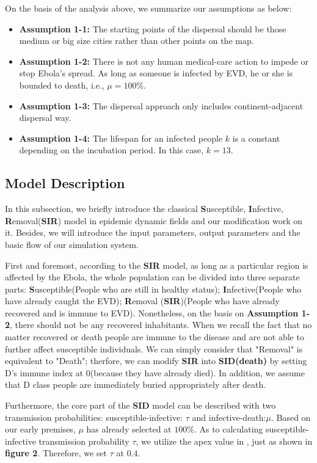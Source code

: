 On the basis of the analysis above, we summarize our assumptions as below:
\begin{itemize}
\item \textbf{Assumption 1-1:} The starting points of the dispersal should be those medium or big size cities rather than other points on the map.
\item \textbf{Assumption 1-2:} There is not any human medical-care action to impede or stop Ebola's spread. As long as someone is infected by EVD, he or she is bounded to death, i.e., $\mu=100\%$.
\item\textbf{Assumption 1-3:} The dispersal approach only includes continent-adjacent dispersal way.
\item\textbf{Assumption 1-4:} The lifespan for an infected people $k$ is a constant depending on the incubation period. In this case, $k=13$.
\end{itemize} 
\subsection{Model Description}
In this subsection, we briefly introduce the classical \textbf{S}usceptible, \textbf{I}nfective, \textbf{R}emoval(\textbf{SIR}) model\cite{mccluskey2010complete} in epidemic dynamic fields and our modification work on it. Besides, we will introduce the input parameters, output parameters and the basic flow of our simulation system.

First and foremost, according to the \textbf{SIR} model, as long as a particular region is affected by the Ebola, the whole population can be divided into three separate parts: \textbf{S}usceptible(People who are still in healthy status); \textbf{I}nfective(People who have already caught the EVD); \textbf{R}emoval (\textbf{SIR})(People who have already recovered and is immune to EVD). Nonetheless, on the basis on \textbf{Assumption 1-2}, there should not be any recovered  inhabitants. When we recall the fact that no matter recovered or death people are immune to the disease and are not able to further affect susceptible individuals. We can simply consider that "Removal" is equivalent to "Death"; therfore, we can modify \textbf{SIR} into \textbf{SID(death)} by setting D's immune index at 0(because they have already died). In addition, we assume that D class people are immediately buried appropriately after death.

Furthermore, the core part of the \textbf{SID} model can be described with two transmission probabilities: susceptible-infective: $\tau$ and infective-death:$\mu$. Based on our early premises, $\mu$ has already selected at $100\%$. As  to calculating susceptible-infective transmission probability $\tau$, we utilize the apex value in \cite{rebaudet2015ebola}, just as shown in \textbf{figure 2}. Therefore, we set $\tau$ at $0.4$.

